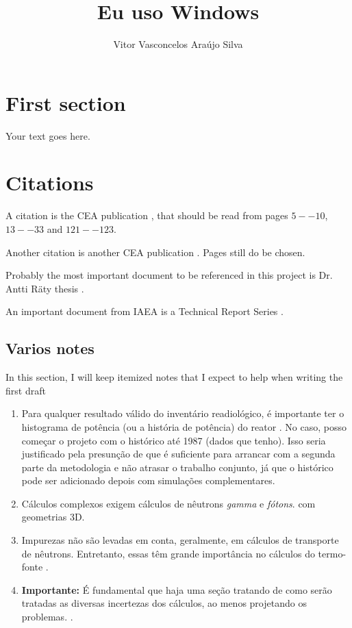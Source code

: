 \documentclass[11pt]{article} %
\title{Eu uso Windows\textregistered}
\author{Vitor Vasconcelos Araújo Silva}
\date{} %
\begin{document}
\maketitle

\section{First section}

Your text goes here.

\section{Citations}

A citation is the CEA publication \cite{Clean-up_CEA-e-DEN_2018}, that should be read from pages $5--10$, $13--33$ and $121--123$.

Another citation is another CEA publication \cite{Neutronics_CEA-e-DEN_2015}. Pages still do be chosen.

Probably the most important document to be referenced in this project is Dr. Antti R{\"a}ty thesis \cite{Raty_Thesis_2020}. 

An important document from IAEA is a Technical Report Series \cite{IAEA_TRS_494_2024}.

\subsection{Varios notes}

In this section, I will keep itemized notes that I expect to help when writing the first draft

\begin{enumerate}
\item Para qualquer resultado válido do inventário readiológico, é importante ter o histograma de potência (ou a história de potência) do reator \cite[p.~21]{Clean-up_CEA-e-DEN_2018}. No caso, posso começar o projeto com o histórico até 1987 (dados que tenho). Isso seria justificado pela presunção de que é suficiente para arrancar com a segunda parte da metodologia e não atrasar o trabalho conjunto, já que o histórico pode ser adicionado depois com simulações complementares.
\item Cálculos complexos exigem cálculos de nêutrons \textit{gamma} e \textit{fótons}.\cite[p.~22]{Clean-up_CEA-e-DEN_2018} com geometrias 3D.
\item Impurezas não são levadas em conta, geralmente, em cálculos de transporte de nêutrons. Entretanto, essas têm grande importância no cálculos do termo-fonte \cite[p.~24]{Clean-up_CEA-e-DEN_2018}.
  \item \textbf{Importante:} É fundamental que haja uma seção tratando de como serão tratadas as diversas incertezas dos cálculos, ao menos projetando os problemas. \cite[p.~165-170]{Neutronics_CEA-e-DEN_2015}.
\end{enumerate}


\end{document}
